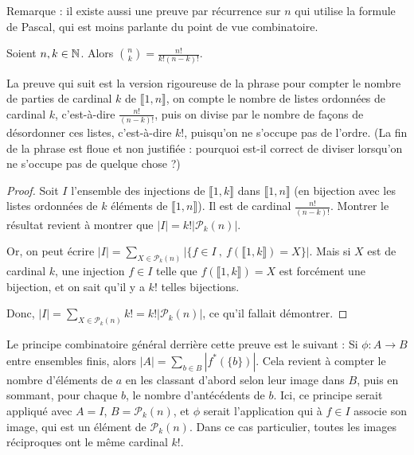 Remarque : il existe aussi une preuve par récurrence sur $n$ qui utilise la formule de Pascal, qui est moins parlante du point de vue combinatoire.

\begin{proposition}Soient $n, k\in \mathbb{N}$. Alors $\binom{n}{k} = \frac{n!}{k!(n-k)!}$.
\end{proposition}

La preuve qui suit est la version rigoureuse de la phrase \og pour compter le nombre de parties de cardinal $k$ de $\llbracket 1,n\rrbracket$, on compte le nombre de  listes ordonnées de cardinal $k$, c'est-à-dire $\frac{n!}{(n-k)!}$, puis on divise par le nombre de façons de désordonner ces listes, c'est-à-dire $k!$, puisqu'on ne s'occupe pas de l'ordre\fg. (La fin de la phrase est floue et non justifiée : pourquoi est-il correct de \og diviser\fg{} lorsqu'on ne \og s'occupe pas\fg{} de quelque chose ?)

\begin{proof} 

Soit $I$ l'ensemble des injections de $\llbracket 1,k\rrbracket$ dans $\llbracket 1,n\rrbracket$ (en bijection avec les listes ordonnées de $k$ éléments de $\llbracket 1,n\rrbracket$). Il est de cardinal $\frac{n!}{(n-k)!}$. Montrer le résultat revient à montrer que $|I| = k! |\mathcal P_k(n)|$.

Or, on peut écrire $|I| = \sum_{X\in \mathcal P_k(n)} \left| \{f\in I\:,\: f(\llbracket 1,k\rrbracket)=X\}\right|$. Mais si $X$ est de cardinal $k$, une injection $f\in I$ telle que  $f(\llbracket 1,k\rrbracket)=X$ est forcément une bijection, et on sait qu'il y a $k!$ telles bijections.

Donc, $|I| = \sum_{X\in \mathcal P_k(n)} k! = k! |\mathcal P_k(n)|$, ce qu'il fallait démontrer.
\end{proof}

\begin{remarque}
Le principe combinatoire général derrière cette preuve est le suivant : Si $\phi : A\to B$ entre ensembles finis, alors $|A| = \sum_{b\in B} \left|f^{*}(\{b\})\right|$. Cela revient à compter le nombre d'éléments de $a$ en les classant d'abord selon leur image dans $B$, puis en sommant, pour chaque $b$, le nombre d'antécédents de $b$. Ici, ce principe serait appliqué avec $A=I$, $B=\mathcal P_k(n)$, et $\phi$ serait l'application qui à $f\in I$ associe son image, qui est un élément de $\mathcal P_k(n)$. Dans ce cas particulier, toutes les images réciproques ont le même cardinal $k!$.
\end{remarque}

